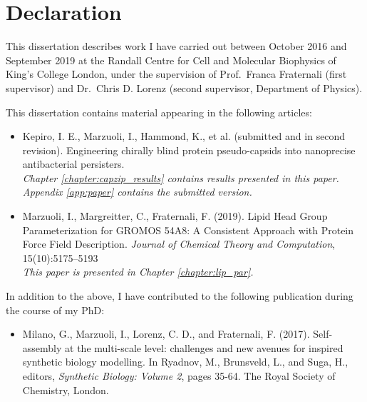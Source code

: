 \chapter*{Declaration}
\begin{onehalfspacing}

\noindent This dissertation describes work I have carried out between October 2016 and September 2019 at the Randall Centre for Cell and Molecular Biophysics of King's College London, under the supervision of Prof.\ Franca Fraternali (first supervisor) and Dr.\ Chris D. Lorenz (second supervisor, Department of Physics).

\vspace{.2cm}

\noindent This dissertation contains material appearing in the following articles:

\begin{itemize}
\item Kepiro, I. E., Marzuoli, I., Hammond, K., et al. (submitted and in second revision). Engineering chirally blind protein pseudo-capsids into nanoprecise antibacterial persisters. \\
\emph{Chapter \ref{chapter:capzip_results} contains results presented in this paper. Appendix \ref{app:paper} contains the submitted version.}
\item Marzuoli, I., Margreitter, C., Fraternali, F. (2019). Lipid Head Group Parameterization for GROMOS 54A8: A Consistent Approach with Protein Force Field Description. \emph{Journal of Chemical Theory and Computation}, 15(10):5175--5193\\
\emph{This paper is presented in Chapter \ref{chapter:lip_par}.}
\end{itemize}

\noindent In addition to the above, I have contributed to the following publication during the course of my PhD:

\begin{itemize}
%
\item Milano, G., Marzuoli, I., Lorenz, C. D., and Fraternali, F. (2017). Self-assembly at the multi-scale level: challenges and new avenues for inspired synthetic biology modelling. In Ryadnov, M., Brunsveld, L., and Suga, H., editors, \emph{Synthetic Biology: Volume 2}, pages 35-64. The Royal Society of Chemistry, London.
%
\end{itemize}



\end{onehalfspacing}
